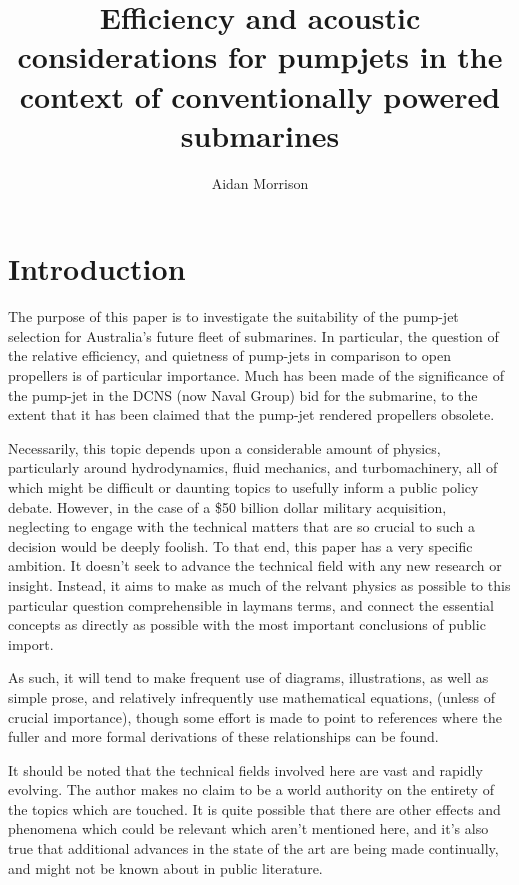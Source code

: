 \documentclass{article}\usepackage[]{graphicx}\usepackage[]{color}
\title{Efficiency and acoustic considerations for pumpjets in the context of conventionally powered submarines}
\author{Aidan Morrison}
\begin{document}
\maketitle




\tableofcontents

\section{Introduction}

The purpose of this paper is to investigate the suitability of the pump-jet selection for Australia's future fleet of submarines.  In particular, the question of the relative efficiency, and quietness of pump-jets in comparison to open propellers is of particular importance.  Much has been made of the significance of the pump-jet in the DCNS (now Naval Group) bid for the submarine, to the extent that it has been claimed that the pump-jet rendered propellers obsolete.

Necessarily, this topic depends upon a considerable amount of physics, particularly around hydrodynamics, fluid mechanics, and turbomachinery, all of which might be difficult or daunting topics to usefully inform a public policy debate. However, in the case of a \$50 billion dollar military acquisition, neglecting to engage with the technical matters that are so crucial to such a decision would be deeply foolish.  To that end, this paper has a very specific ambition.  It doesn't seek to advance the technical field with any new research or insight.  Instead, it aims to make as much of the relvant physics as possible to this particular question comprehensible in laymans terms, and connect the essential concepts as directly as possible with the most important conclusions of public import.

As such, it will tend to make frequent use of diagrams, illustrations, as well as simple prose, and relatively infrequently use mathematical equations, (unless of crucial importance), though some effort is made to point to references where the fuller and more formal derivations of these relationships can be found.

It should be noted that the technical fields involved here are vast and rapidly evolving.  The author makes no claim to be a world authority on the entirety of the topics which are touched. It is quite possible that there are other effects and phenomena which could be relevant which aren't mentioned here, and it's also true that additional advances in the state of the art are being made continually, and might not be known about in public literature.
\end{document}
